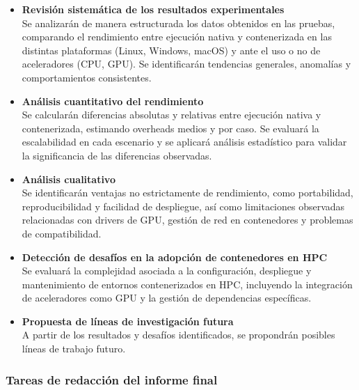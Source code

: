 \begin{itemize}
    \item \textbf{Revisión sistemática de los resultados experimentales} \\
          Se analizarán de manera estructurada los datos obtenidos en las pruebas, comparando el rendimiento entre ejecución nativa y contenerizada en las distintas plataformas (Linux, Windows, macOS) y ante el uso o no de aceleradores (CPU, GPU). Se identificarán tendencias generales, anomalías y comportamientos consistentes.

    \item \textbf{Análisis cuantitativo del rendimiento} \\
          Se calcularán diferencias absolutas y relativas entre ejecución nativa y contenerizada, estimando overheads medios y por caso. Se evaluará la escalabilidad en cada escenario y se aplicará análisis estadístico para validar la significancia de las diferencias observadas.

    \item \textbf{Análisis cualitativo} \\
          Se identificarán ventajas no estrictamente de rendimiento, como portabilidad, reproducibilidad y facilidad de despliegue, así como limitaciones observadas relacionadas con drivers de GPU, gestión de red en contenedores y problemas de compatibilidad.

    \item \textbf{Detección de desafíos en la adopción de contenedores en HPC} \\
          Se evaluará la complejidad asociada a la configuración, despliegue y mantenimiento de entornos contenerizados en HPC, incluyendo la integración de aceleradores como GPU y la gestión de dependencias específicas.

    \item \textbf{Propuesta de líneas de investigación futura} \\
          A partir de los resultados y desafíos identificados, se propondrán posibles líneas de trabajo futuro.
\end{itemize}

\subsubsection{Tareas de redacción del informe final}\label{subsubsec:tareas_redaccion}

